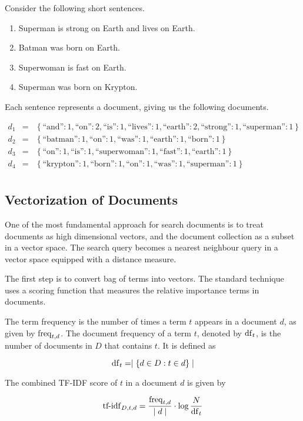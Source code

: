 	\begin{ex}
	\label{ex:superhero-documents}
		Consider the following short sentences.
		
		\begin{enumerate}
			\item Superman is strong on Earth and lives on Earth.
			\item Batman was born on Earth.
			\item Superwoman is fast on Earth.
			\item Superman was born on Krypton.
		\end{enumerate}
		
		Each sentence represents a document, giving us the following documents.
		
		\begin{eqnarray*}
			d_1 &=& \left\{\textrm{``and''}: 1, \textrm{``on''}: 2, \textrm{``is''}: 1, \textrm{``lives''}: 1, \textrm{``earth''}: 2, \textrm{``strong''}: 1, \textrm{``superman''}: 1\right\} \\
			d_2 &=& \left\{\textrm{``batman''}: 1, \textrm{``on''}: 1, \textrm{``was''}: 1, \textrm{``earth''}: 1, \textrm{``born''}: 1\right\} \\
			d_3 &=& \left\{\textrm{``on''}: 1, \textrm{``is''}: 1, \textrm{``superwoman''}: 1, \textrm{``fast''}: 1, \textrm{``earth''}: 1\right\} \\
			d_4 &=& \left\{\textrm{``krypton''}: 1, \textrm{``born''}: 1, \textrm{``on''}: 1, \textrm{``was''}: 1, \textrm{``superman''}: 1\right\} \\
		\end{eqnarray*}
	\end{ex}
	
	\subsection{Vectorization of Documents}
		One of the most fundamental approach for search documents is to treat documents as high dimensional vectors, and the document collection as a subset in a vector space.  The search query becomes a nearest neighbour query in a vector space equipped with a distance measure.
		
		The first step is to convert bag of terms into vectors.  The standard technique \cite{ir-08} uses a scoring function that measures the relative importance terms in documents.
		
		\begin{defn}
			The term frequency is the number of times a term $t$ appears in a document $d$, as given by $\operatorname{freq}_{t, d}$.  The document frequency of a term $t$, denoted by $\operatorname{df}_t$, is the number of documents in $D$ that contains $t$.  It is defined as
			
			$$\operatorname{df}_t = \mid \left\{d \in D: t \in d\right\} \mid$$
			
			The combined TF-IDF score of $t$ in a document $d$ is given by
			
			$$\operatorname{tf-idf}_{D, t, d} = \frac{\operatorname{freq}_{t, d}}{\mid d \mid} \cdot \log{\frac{N}{\operatorname{df}_t}}$$
		\end{defn}
		
